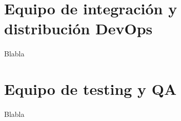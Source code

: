 \section{Equipo de integración y distribución DevOps}

\paragraph{}Blabla

\section{Equipo de testing y QA}

\paragraph{}Blabla

